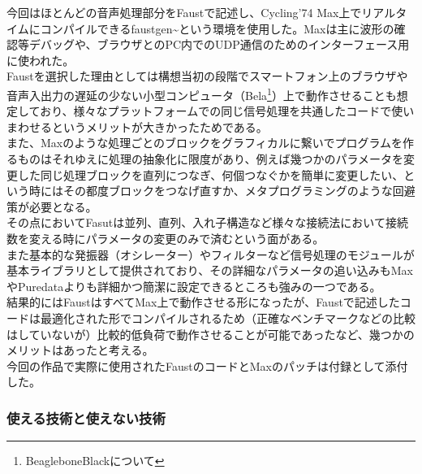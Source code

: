\documentclass[a4paper,report]{jsbook}
\begin{document}
今回はほとんどの音声処理部分をFaustで記述し、Cycling'74
Max上でリアルタイムにコンパイルできるfaustgen\textasciitilde{}という環境を使用した。Maxは主に波形の確認等デバッグや、ブラウザとのPC内でのUDP通信のためのインターフェース用に使われた。\\
Faustを選択した理由としては構想当初の段階でスマートフォン上のブラウザや音声入出力の遅延の少ない小型コンピュータ（Bela\footnote{BeagleboneBlackについて}）上で動作させることも想定しており、様々なプラットフォームでの同じ信号処理を共通したコードで使いまわせるというメリットが大きかったためである。\\
また、Maxのような処理ごとのブロックをグラフィカルに繋いでプログラムを作るものはそれゆえに処理の抽象化に限度があり、例えば幾つかのパラメータを変更した同じ処理ブロックを直列につなぎ、何個つなぐかを簡単に変更したい、という時にはその都度ブロックをつなげ直すか、メタプログラミングのような回避策が必要となる。\\
その点においてFasutは並列、直列、入れ子構造など様々な接続法において接続数を変える時にパラメータの変更のみで済むという面がある。\\
また基本的な発振器（オシレーター）やフィルターなど信号処理のモジュールが基本ライブラリとして提供されており、その詳細なパラメータの追い込みもMaxやPuredataよりも詳細かつ簡潔に設定できるところも強みの一つである。\autocites[
]{Orlarey2004faust}{smith2012signal}\\
結果的にはFaustはすべてMax上で動作させる形になったが、Faustで記述したコードは最適化された形でコンパイルされるため（正確なベンチマークなどの比較はしていないが）比較的低負荷で動作させることが可能であったなど、幾つかのメリットはあったと考える。\\
今回の作品で実際に使用されたFaustのコードとMaxのパッチは付録として添付した。

\subsubsection{使える技術と使えない技術}\label{ux4f7fux3048ux308bux6280ux8853ux3068ux4f7fux3048ux306aux3044ux6280ux8853}
\end{document}
